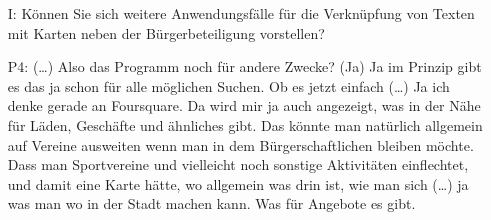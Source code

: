 \begin{itemize}
    \item[I:] K{\"o}nnen Sie sich weitere Anwendungsf{\"a}lle f{\"u}r die Verkn{\"u}pfung von Texten mit Karten neben der B{\"u}rgerbeteiligung vorstellen?
    \item[P4:] (\dots) Also das Programm noch f{\"u}r andere Zwecke? (Ja) Ja im Prinzip gibt es das ja schon f{\"u}r alle m{\"o}glichen Suchen. Ob es jetzt einfach (\dots) Ja ich denke gerade an Foursquare. Da wird mir ja auch angezeigt, was in der N{\"a}he f{\"u}r L{\"a}den, Gesch{\"a}fte und {\"a}hnliches gibt. Das k{\"o}nnte man nat{\"u}rlich allgemein auf Vereine ausweiten wenn man in dem B{\"u}rgerschaftlichen bleiben m{\"o}chte. Dass man Sportvereine und vielleicht noch sonstige Aktivit{\"a}ten einflechtet, und damit eine Karte h{\"a}tte, wo allgemein was drin ist, wie man sich (\dots) ja was man wo in der Stadt machen kann. Was f{\"u}r Angebote es gibt.
\end{itemize}

